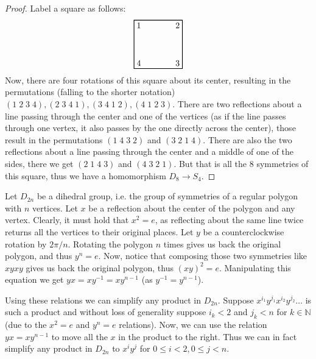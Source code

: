 \begin{problem}
\end{problem}

\begin{proof}
	Label a square as follows:
	\begin{equation*}
	\begin{tikzpicture}
		\node[draw=black, thick,minimum width=2cm,minimum height=2cm] (rect) at (0,0) {};
		\foreach \anc/\n in {south west/4,north west/1,north east/2,south east/3}{
			\node[anchor=\anc] at (rect.\anc) {\n};
		}
	\end{tikzpicture}
	\end{equation*}
	Now, there are four rotations of this square about its center, resulting in the permutations (falling to the shorter notation) $(1\;2\;3\;4), (2\;3\;4\;1), (3\;4\;1\;2), (4\;1\;2\;3)$. There are two reflections about a line passing through the center and one of the vertices (as if the line passes through one vertex, it also passes by the one directly across the center), those result in the permutations $(1\;4\;3\;2)$ and $(3\;2\;1\;4)$. There are also the two reflections about a line passing through the center and a middle of one of the sides, there we get $(2\;1\;4\;3)$ and $(4\;3\;2\;1)$. But that is all the $8$ symmetries of this square, thus we have a homomorphism $D_8 \to S_4$.
\end{proof}

\begin{problem}
\end{problem}

\begin{solution}
	Let $D_{2n}$ be a dihedral group, i.e. the group of symmetries of a regular polygon with $n$ vertices. Let $x$ be a reflection about the center of the polygon and any vertex. Clearly, it must hold that $x^2 = e$, as reflecting about the same line twice returns all the vertices to their original places. Let $y$ be a counterclockwise rotation by $2\pi/n$. Rotating the polygon $n$ times gives us back the original polygon, and thus $y^n=e$.  Now, notice that composing those two symmetries like $xyxy$ gives us back the original polygon, thus $(xy)^2=e$. Manipulating this equation we get $yx=xy^{-1}=xy^{n-1}$ (as $y^{-1}=y^{n-1}$). 
	
	Using these relations we can simplify any product in $D_{2n}$. Suppose $x^{i_1}y^{j_1}x^{i_2}y^{j_2}\dots$ is such a product and without loss of generality suppose $i_k < 2$ and $j_k < n$ for $k \in \mathbb{N}$ (due to the $x^2=e$ and $y^n=e$ relations). Now, we can use the relation $yx = xy^{n-1}$ to move all the $x$ in the product to the right. Thus we can in fact simplify any product in $D_{2n}$ to $x^i y^j$ for $0 \leq i < 2, 0 \leq j < n$.
\end{solution}

